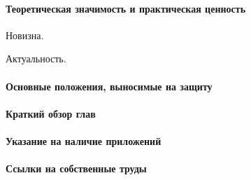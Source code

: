 \paragraph{Теоретическая значимость и практическая ценность}

Новизна.

Актуальность.

\paragraph{Основные положения, выносимые на защиту}

\paragraph{Краткий обзор глав}


\paragraph{Указание на наличие приложений}

\paragraph{Ссылки на собственные труды}

